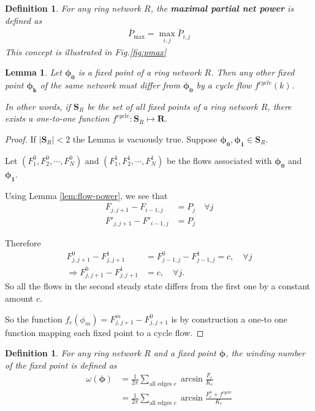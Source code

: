 \documentclass[10pt,aps,pra,onecolumn,superscriptaddress]{revtex4-1}
\newtheorem{defn}[thm]{Definition}
\renewcommand{\vec}[1]{\boldsymbol{#1}}
\newtheorem{lemma}{Lemma}
\begin{document}
\begin{defn}
For any ring network $R$, the \textbf{maximal partial net power} is defined as
\begin{align}
\label{def:mpnp}
\bar{P}_{\max}=\max_{i,j} \bar{P}_{i,j}
\end{align}
This concept is illustrated in Fig.\ref{fig:pmax}
\end{defn}


\begin{lemma}
\label{lem:cf-fp-corr}
Let $\vec{\phi_0}$ is a fixed point of a ring network $R$.  Then any other 
fixed point $\vec{\phi_k}$ of the same network must differ from $\vec{\phi_0}$ 
by a \emph{cycle flow} $f^{cycle}(k)$.  

In other words, if $\mathbf{S}_R$ be the set 
of all fixed points of a ring network $R$, there exists a one-to-one 
function $f^{cycle}:\mathbf{S}_R\mapsto \mathbf{R}$. 
\end{lemma}

\begin{proof}
If $|\mathbf{S}_R|<2$  the Lemma is vacuously true.  
Suppose $\vec{\phi_0},\vec{\phi_1} \in \mathbf{S}_R$.   

Let $(F^0_1, F^0_2,\cdots,F^0_N)$ and $(F^1_1, F^1_2,\cdots,F^1_N)$ be the flows 
associated with $\vec{\phi_0}$ and $\vec{\phi_1}$.  

Using Lemma \ref{lem:flow-power}, we see that
\begin{align}
\label{}
F_{j,j+1}-F_{i-1,j}&=P_j\quad\forall j \\
F'_{j,j+1}-F'_{i-1,j}&=P_j
\end{align}

Therefore
\begin{align}
\label{}
F^0_{j,j+1}-F^1_{j,j+1}&=F^0_{j-1,j}-F^1_{j-1,j}=c,\quad\forall j\\
\Rightarrow F^0_{j,j+1}-F^1_{j,j+1}&=c,\quad\forall j.   
\end{align}
So all the flows in the second steady state differs from the first one by a 
constant amount $c$.   

So the function $f_c(\phi_m)=F^m_{j,j+1}-F^0_{j,j+1}$ is by construction a 
one-to one function mapping each fixed point to a cycle flow.  
\end{proof}



\begin{defn}
For any ring network $R$ and a fixed point $\vec{\phi}$, the \emph{winding 
number of the fixed point} is defined as 
\begin{align}
\label{def:wnum}
\omega(\vec{\phi})&=\frac{1}{2\pi}\sum_{\text{all edges }e} \arcsin{\frac{F_e}{K_e}}\\
&=\frac{1}{2\pi}\sum_{\text{all edges }e} \arcsin{\frac{F_e^0+f^{cycle}}{K_e}}
\end{align}
\end{defn}
\end{document}
